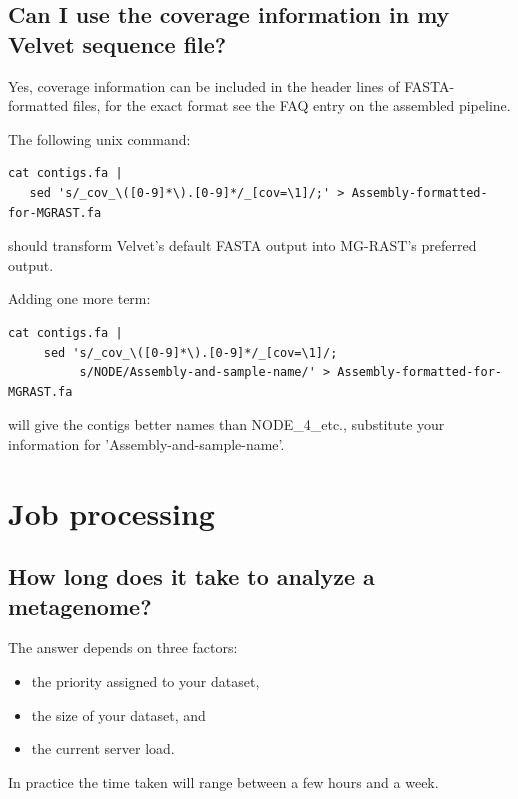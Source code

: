 \documentclass[12pt,fullpage]{report}
\begin{document}
\subsection{Can I use the coverage information in my Velvet sequence file?}
Yes, coverage information can be included in the header lines of FASTA-formatted files, for the exact format see the FAQ entry on the assembled pipeline.
 
\noindent
The following unix command:

\noindent
\begin{small} 
\begin{verbatim}
cat contigs.fa |
   sed 's/_cov_\([0-9]*\).[0-9]*/_[cov=\1]/;' > Assembly-formatted-for-MGRAST.fa
\end{verbatim}
\end{small}
\noindent
should transform Velvet's default FASTA output into MG-RAST's preferred output.


\noindent
Adding one more term:
\noindent
\begin{small} 
\begin{verbatim}
cat contigs.fa | 
     sed 's/_cov_\([0-9]*\).[0-9]*/_[cov=\1]/;
          s/NODE/Assembly-and-sample-name/' > Assembly-formatted-for-MGRAST.fa
\end{verbatim}
\end{small}

\noindent
will give the contigs better names than NODE\_4\_etc., substitute your information for 'Assembly-and-sample-name'.
\section{Job processing}
\subsection{How long does it take to analyze a metagenome?}
The answer depends on three factors:
\begin{itemize}
\item  the priority assigned to your dataset,
\item  the size of your dataset, and
\item  the current server load.
\end{itemize}
In practice the time taken will range between a few hours and a week.
\end{document}
